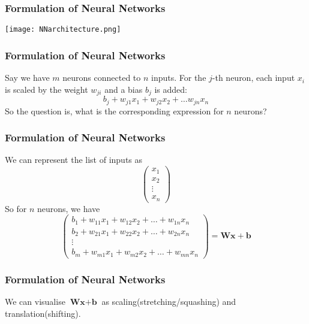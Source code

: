 \documentclass{beamer}
\begin{document}
\begin{frame}
    \frametitle{Formulation of Neural Networks}
    \texttt{[image: NNarchitecture.png]}
\end{frame}
\begin{frame}
\frametitle{Formulation of Neural Networks}
\begin{tcolorbox}
[colback=orange!5!white,colframe=orange!75!black,title=Exercise 3]
Say we have $m$ neurons connected to $n$ inputs. For the $j$-th neuron, each input $x_i$ is scaled by the weight $w_{ji}$ and a bias $b_j$ is added:
$$b_j+w_{j1}x_1+w_{j2}x_2+\dots w_{jn}x_n$$
So the question is, what is the corresponding expression for $n$ neurons?
\end{tcolorbox}
\end{frame}
\begin{frame}
\frametitle{Formulation of Neural Networks}
\begin{tcolorbox}
[colback=red!5!white,colframe=red!75!black,title=Answer to Exercise 3]
We can represent the list of inputs as 
$$\begin{pmatrix}
    x_1\\
    x_2\\
    \vdots\\
    x_n
\end{pmatrix}$$
So for $n$ neurons, we have
$$\begin{pmatrix}
    b_1+w_{11}x_1+w_{12}x_2+\dots+w_{1n}x_n\\
    b_2+w_{21}x_1+w_{22}x_2+\dots+w_{2n}x_n\\
    \vdots\\
    b_m+w_{m1}x_1+w_{m2}x_2+\dots+w_{mn}x_n
\end{pmatrix}=\textbf{Wx}+\textbf{b}$$
\end{tcolorbox}
\end{frame}
\begin{frame}
\frametitle{Formulation of Neural Networks}
\begin{tcolorbox}
[colback=red!5!white,colframe=red!75!black,title= Remark on Answer to Exercise 3]
We can visualise $\textbf{Wx}+\textbf{b}$ as scaling(stretching/squashing) and translation(shifting).
\end{tcolorbox}
\end{frame}
\end{document}
